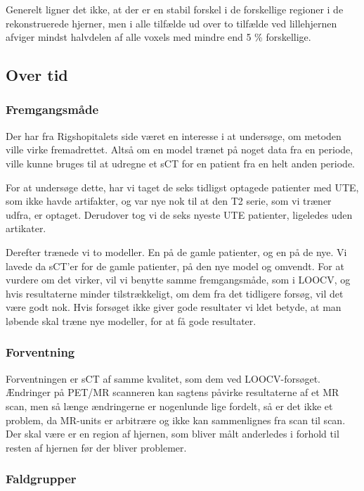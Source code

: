 Generelt ligner det ikke, at der er en stabil forskel i de forskellige
regioner i de rekonstruerede hjerner, men i alle tilfælde ud over to
tilfælde ved lillehjernen afviger mindst halvdelen af alle voxels med
mindre end 5 \% forskellige.


\subsection{Over tid}
\subsubsection{Fremgangsmåde}

Der har fra Rigshopitalets side været en interesse i at undersøge, om
metoden ville virke fremadrettet. Altså om en model trænet på noget data
fra en periode, ville kunne bruges til at udregne et sCT for en patient
fra en helt anden periode. 

For at undersøge dette, har vi taget de seks
tidligst optagede patienter med UTE, som ikke havde artifakter, og
var nye nok til at den T2 serie, som vi træner udfra, er optaget.
Derudover tog vi de seks nyeste UTE patienter, ligeledes uden artikater.


Derefter trænede vi to modeller. En på de gamle patienter, og en på de
nye. Vi lavede da sCT'er for de gamle patienter, på den nye model og
omvendt. For at vurdere om det virker, vil vi benytte samme fremgangsmåde,
som i LOOCV, og hvis resultaterne minder tilstrækkeligt, om dem fra det
tidligere forsøg, vil det være godt nok. Hvis forsøget ikke giver gode
resultater vi ldet betyde, at man løbende skal træne nye modeller, for at
få gode resultater.

\subsubsection{Forventning}

Forventningen er sCT af samme kvalitet, som dem ved LOOCV-forsøget.
Ændringer på PET/MR scanneren kan sagtens påvirke resultaterne af et MR
scan, men så længe ændringerne er nogenlunde lige fordelt, så er det ikke
et problem, da MR-units er arbitrære og ikke kan sammenlignes fra scan til
scan. Der skal være er en region af hjernen, som bliver målt anderledes i
forhold til resten af hjernen før der bliver problemer.

\subsubsection{Faldgrupper}

